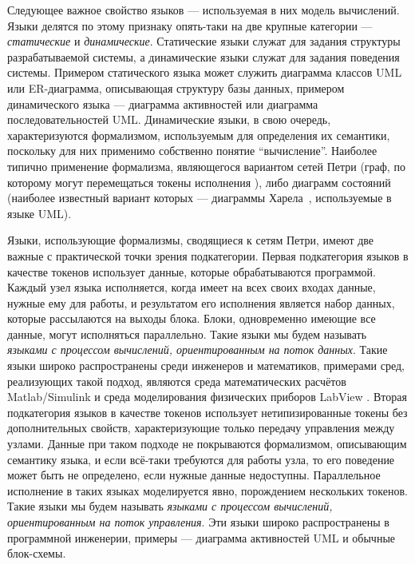 Следующее важное свойство языков --- используемая в них модель вычислений. Языки 
делятся по этому признаку опять-таки на две крупные категории --- \textit{статические} 
и \textit{динамические}. Статические языки служат для задания структуры разрабатываемой 
системы, а динамические языки служат для задания поведения системы. Примером 
статического языка может служить диаграмма классов \ac{UML} или \ac{ER}-диаграмма, 
описывающая структуру базы данных, примером динамического языка --- диаграмма 
активностей или диаграмма последовательностей \ac{UML}. Динамические языки, в свою 
очередь, характеризуются формализмом, используемым для определения их семантики, 
поскольку для них применимо собственно понятие "`вычисление"'. Наиболее типично 
применение формализма, являющегося вариантом сетей Петри (граф, по которому 
могут перемещаться токены исполнения%
), либо диаграмм состояний
(наиболее известный вариант которых --- диаграммы Харела~\cite{harel1987statecharts}, используемые в языке \ac{UML}). 

Языки, использующие формализмы, сводящиеся к сетям Петри, имеют две важные с 
практической точки зрения подкатегории. Первая подкатегория языков в качестве 
токенов использует данные, которые обрабатываются программой. Каждый узел языка 
исполняется, когда имеет на всех своих входах данные, нужные ему для работы, 
и результатом его исполнения является набор данных, которые рассылаются на 
выходы блока. Блоки, одновременно имеющие все данные, могут исполняться 
параллельно. Такие языки мы будем называть \textit{языками с процессом вычислений, 
ориентированным на поток данных}. Такие языки широко распространены среди 
инженеров и математиков, примерами сред, реализующих такой подход, являются 
среда математических расчётов Matlab/Simulink%
 и среда моделирования физических приборов LabView%
. Вторая подкатегория языков в качестве токенов использует 
нетипизированные токены без дополнительных свойств, характеризующие только 
передачу управления между узлами. Данные при таком подходе не покрываются 
формализмом, описывающим семантику языка, и если всё-таки требуются для работы 
узла, то его поведение может быть не определено, если нужные данные недоступны. 
Параллельное исполнение в таких языках моделируется явно, порождением нескольких 
токенов. Такие языки мы будем называть \textit{языками с процессом вычислений, 
ориентированным на поток управления}. Эти языки широко распространены в 
программной инженерии, примеры --- диаграмма активностей \ac{UML} и обычные 
блок-схемы.

